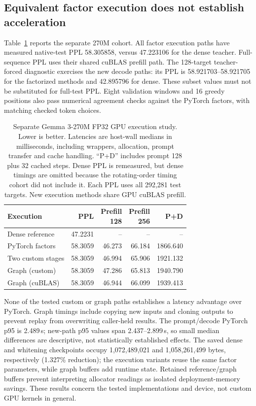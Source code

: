 \documentclass[conference]{IEEEtran}
\begin{document}
\subsection{Equivalent factor execution does not establish acceleration}
Table~\ref{tab:gpu270-execution} reports the separate 270M cohort. All factor execution paths have measured native-test PPL 58.305858, versus 47.223106 for the dense teacher. Full-sequence PPL uses their shared cuBLAS prefill path. The 128-target teacher-forced diagnostic exercises the new decode paths: its PPL is 58.921703--58.921705 for the factorized methods and 42.895796 for dense. These subset values must not be substituted for full-test PPL. Eight validation windows and 16 greedy positions also pass numerical agreement checks against the PyTorch factors, with matching checked token choices.\par\smallskip
\begin{table}[t]
\centering
\caption{Separate Gemma 3-270M FP32 GPU execution study. Lower is better. Latencies are host-wall medians in milliseconds, including wrappers, allocation, prompt transfer and cache handling. ``P+D'' includes prompt 128 plus 32 cached steps. Dense PPL is remeasured, but dense timings are omitted because the rotating-order timing cohort did not include it. Each PPL uses all 292,281 test targets. New execution methods share GPU cuBLAS prefill.}
\label{tab:gpu270-execution}
{\footnotesize\setlength{\tabcolsep}{3pt}
\begin{tabular}{@{}lrrrr@{}}\toprule
Execution & PPL & \shortstack{Prefill\\128} & \shortstack{Prefill\\256} & P+D \\
\midrule
Dense reference & 47.2231 & -- & -- & -- \\
PyTorch factors & 58.3059 & 46.273 & 66.184 & 1866.640 \\
Two custom stages & 58.3059 & 46.994 & 65.906 & 1921.132 \\
Graph (custom) & 58.3059 & 47.286 & 65.813 & 1940.790 \\
Graph (cuBLAS) & 58.3059 & 46.944 & 66.099 & 1939.413 \\
\bottomrule\end{tabular}}
\end{table}
None of the tested custom or graph paths establishes a latency advantage over PyTorch. Graph timings include copying new inputs and cloning outputs to prevent replay from overwriting caller-held results. The prompt/decode PyTorch p95 is 2.489\,s; new-path p95 values span 2.437--2.899\,s, so small median differences are descriptive, not statistically established effects. The saved dense and whitening checkpoints occupy 1,072,489,021 and 1,058,261,499 bytes, respectively (1.327\% reduction); the execution variants reuse the same factor parameters, while graph buffers add runtime state. Retained reference/graph buffers prevent interpreting allocator readings as isolated deployment-memory savings. These results concern the tested implementations and device, not custom GPU kernels in general.\par\smallskip
\end{document}
